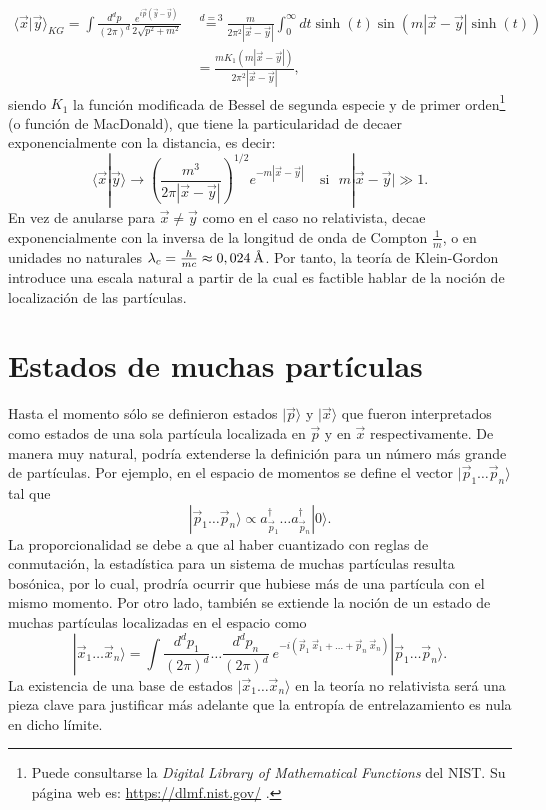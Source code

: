 \begin{equation}
\begin{split}
\langle \vec{x}|\vec{y} \rangle_{KG}=\int \frac{d^dp}{(2\pi)^d} \frac{e^{i\vec{p}(\vec{y}-\vec{y})}}{2\sqrt{p^2+m^2}}\,&\stackrel{d=3}{=}\frac{m}{2\pi^2 |\vec{x}-\vec{y}|}\int_0^{\infty} dt \sinh(t)\sin(m|\vec{x}-\vec{y}|\sinh(t))\\
&= \frac{mK_1(m|\vec{x}-\vec{y}|)}{2\pi^2|\vec{x}-\vec{y}|},
\end{split}
\end{equation}
siendo $K_1$ la función modificada de Bessel de segunda especie y de primer orden\footnote{Puede consultarse la \textit{Digital Library of Mathematical Functions} del NIST. Su página web es: \url{https://dlmf.nist.gov/} .} (o función de MacDonald), que tiene la particularidad de decaer exponencialmente con la distancia, es decir:
\begin{equation}
\langle \vec{x}|\vec{y} \rangle \longrightarrow \left(\frac{m^3}{2\pi|\vec{x}-\vec{y}|}\right)^{1/2} e^{-m|\vec{x}-\vec{y}|}\:\:\: \:\: \text{si}\:\:\: m|\vec{x}-\vec{y}| \gg 1.
\end{equation}
En vez de anularse para $\vec{x} \neq \vec{y}$ como en el caso no relativista, decae exponencialmente con la inversa de la longitud de onda de Compton $\frac{1}{m}$, o en unidades no naturales $\lambda_c=\frac{h}{mc}\approx 0,024 \: \textup{\r{A}}$. Por tanto, la teoría de Klein-Gordon introduce una escala natural a partir de la cual es factible hablar de la noción de localización de las partículas.
\section{Estados de muchas partículas}
Hasta el momento sólo se definieron estados $|\vec{p}\rangle$ y $|\vec{x}\rangle$ que fueron interpretados como estados de una sola partícula localizada en $\vec{p}$ y en $\vec{x}$ respectivamente. De manera muy natural, podría extenderse la definición para un número más grande de partículas. Por ejemplo, en el espacio de momentos se define   el vector $|\vec{p}_1\ldots \vec{p}_n\rangle$ tal que
\begin{equation}
|\vec{p}_1\ldots \vec{p}_n\rangle \propto a^{\dag}_{\vec{p}_{1}}
\ldots a^{\dag}_{\vec{p}_n}|0\rangle.
\end{equation}
La proporcionalidad se debe a que al haber cuantizado con reglas de conmutación, la estadística para un sistema de muchas partículas resulta bosónica, por lo cual, prodría ocurrir que hubiese más de una partícula con el mismo momento. Por otro lado, también se extiende la noción de un estado de muchas partículas localizadas en el espacio como
\begin{equation}
|\vec{x}_1 \ldots \vec{x}_n \rangle =\int \frac{d^dp_1}{(2\pi)^d}\ldots \frac{d^dp_n}{(2\pi)^d}\: e^{-i( \vec{p}_1 \:\vec{x}_1+\ldots+\vec{p}_n \:\vec{x}_n)} |\vec{p}_1\ldots \vec{p}_n\rangle .
\end{equation}
La existencia de una base de estados $|\vec{x}_1 \ldots \vec{x}_n \rangle$ en la teoría no relativista será una pieza clave para justificar más adelante que la entropía de entrelazamiento es nula en dicho límite.

